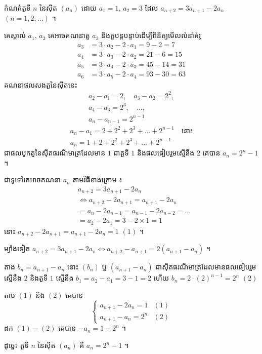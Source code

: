 \begin{example}[ឧទាហរណ៍]
កំណត់តួទី $n$ នៃស៊ីត $(a_n)$ ដោយ $a_1 = 1$, $a_2 = 3$ ដែល $a_{n+2} = 3a_{n+1} - 2a_n$ $(n = 1, 2, \ldots)$ ។

គេស្គាល់ $a_1$, $a_2$ គេអាចគណនាតួ $a_3$ និងតួបន្តបន្ទាប់ដើម្បីពិនិត្យមើលលំនាំគំរូ
\[
\begin{aligned}
a_3 &= 3 \cdot a_2 - 2 \cdot a_1 = 9 - 2 = 7\\
a_4 &= 3 \cdot a_3 - 2 \cdot a_2 = 21 - 6 = 15\\
a_5 &= 3 \cdot a_4 - 2 \cdot a_3 = 45 - 14 = 31\\
a_6 &= 3 \cdot a_5 - 2 \cdot a_4 = 93 - 30 = 63
\end{aligned}
\]
គណនាផលសងតួនៃស៊ីតនេះ
\[
\begin{gathered}
a_2 - a_1 = 2, \quad a_3 - a_2 = 2^2,\\
a_4 - a_3 = 2^3, \quad \ldots,\\
a_n - a_{n-1} = 2^{n-1}
\end{gathered}
\]
\[
\begin{gathered}
a_n - a_1 = 2 + 2^2 + 2^3 + \ldots + 2^{n-1} \quad \text{នោះ}\\
a_n = 1 + 2 + 2^2 + 2^3 + \ldots + 2^{n-1}
\end{gathered}
\]
ជាផលបូកតួនៃស៊ីតធរណីមាត្រដែលមាន $1$ ជាតួទី $1$ និងផលធៀបរួមស្មើនឹង $2$ គេបាន $a_n = 2^n - 1$ ។

ជាទូទៅគេអាចគណនា $a_n$ តាមវិធីខាងក្រោម ៖
\[
\begin{aligned}
&a_{n+2} = 3a_{n+1} - 2a_n\\
&\iff a_{n+2} - 2a_{n+1} = a_{n+1} - 2a_n\\
&= a_n - 2a_{n-1} = a_{n-1} - 2a_{n-2} = \ldots\\
&= a_2 - 2a_1 = 3 - 2 \times 1 = 1
\end{aligned}
\]
នោះ $a_{n+2} - 2a_{n+1} = a_{n+1} - 2a_n = 1$ \quad $(1)$ ។

ម្យ៉ាងទៀត $a_{n+2} = 3a_{n+1} - 2a_n \iff a_{n+2} - a_{n+1} = 2(a_{n+1} - a_n)$ ។

តាង $b_n = a_{n+1} - a_n$ នោះ $(b_n)$ ឬ $(a_{n+1} - a_n)$ ជាស៊ីតធរណីមាត្រដែលមានផលធៀបរួមស្មើនឹង $2$ និងតួទី $1$ ស្មើនឹង $b_1 = a_2 - a_1 = 3 - 1 = 2$ ហើយ $b_n = 2 \cdot (2)^{n-1} = 2^n$ \quad $(2)$

តាម $(1)$ និង $(2)$ គេបាន
\[
\begin{cases}
a_{n+1} - 2a_n = 1 & (1)\\
a_{n+1} - a_n = 2^n & (2)
\end{cases}
\]
ដក $(1) - (2)$ គេបាន $-a_n = 1 - 2^n$ ។

ដូច្នេះ តួទី $n$ នៃស៊ីត $(a_n)$ គឺ $a_n = 2^n - 1$ ។
\end{example}

